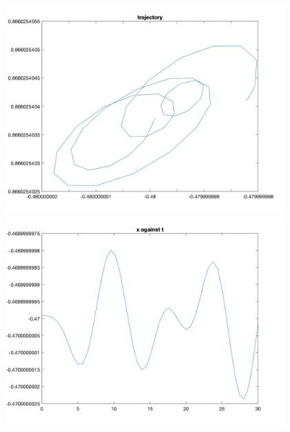 \documentclass[11pt]{article}
\begin{document}
\begin{figure}[H]
\includegraphics[width = 12cm, height = 8cm]{Q5(18).jpg}\\\includegraphics[width = 12cm, height = 8cm]{Q5(19).jpg}
\end{figure}
\end{document}
